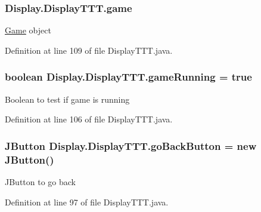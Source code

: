 \subsubsection[{game}]{ Display.\+Display\+T\+T\+T.\+game\hspace{0.3cm}{\ttfamily [private]}}\label{class_display_1_1_display_t_t_t_a2e4a57cf17355b6a63f5b9d4e9e74de4}
\hyperlink{namespace_game}{Game} object 

Definition at line 109 of file Display\+T\+T\+T.\+java.

\hypertarget{class_display_1_1_display_t_t_t_a8d67b95462ceda8ce22f992628f91ca4}{}
\subsubsection[{game\+Running}]{\setlength{\rightskip}{0pt plus 5cm}boolean Display.\+Display\+T\+T\+T.\+game\+Running = true\hspace{0.3cm}{\ttfamily [private]}}\label{class_display_1_1_display_t_t_t_a8d67b95462ceda8ce22f992628f91ca4}
Boolean to test if game is running 

Definition at line 106 of file Display\+T\+T\+T.\+java.

\hypertarget{class_display_1_1_display_t_t_t_a25d9abae3eed1579b8c8a59f7d0450fa}{}
\subsubsection[{go\+Back\+Button}]{\setlength{\rightskip}{0pt plus 5cm}J\+Button Display.\+Display\+T\+T\+T.\+go\+Back\+Button = new J\+Button()\hspace{0.3cm}{\ttfamily [private]}}\label{class_display_1_1_display_t_t_t_a25d9abae3eed1579b8c8a59f7d0450fa}
J\+Button to go back 

Definition at line 97 of file Display\+T\+T\+T.\+java.

\hypertarget{class_display_1_1_display_t_t_t_a863d5b47363b01c44552068cd9ee832f}{}
